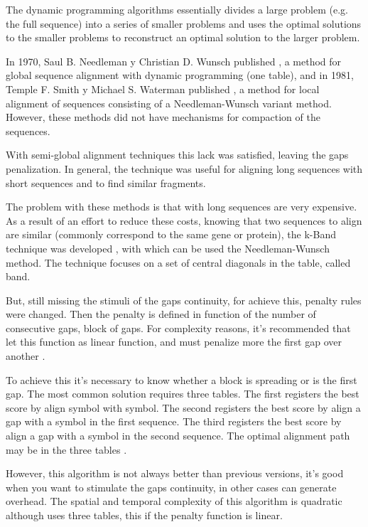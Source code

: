 \documentclass[journal]{IEEEtran}
\begin{document}
The dynamic programming algorithms essentially divides a large problem (e.g. the full sequence) into a series of smaller problems and uses the optimal solutions to the smaller problems to reconstruct an optimal solution to the larger problem.

In 1970, Saul B. Needleman y Christian D. Wunsch published \cite{needleman1970align}, a method for global sequence alignment with dynamic programming (one table), and in 1981, Temple F. Smith y Michael S. Waterman published \cite{smith1981align}, a method for local alignment of sequences consisting of a Needleman-Wunsch variant method. However, these methods did not have mechanisms for compaction of the sequences.

With semi-global alignment techniques this lack was satisfied, leaving the gaps penalization. In general, the technique was useful for aligning long sequences with short sequences and to find similar fragments.

The problem with these methods is that with long sequences are very expensive. As a result of an effort to reduce these costs, knowing that two sequences to align are similar (commonly correspond to the same gene or protein), the k-Band technique was developed \cite{chao1992align}, with which can be used the Needleman-Wunsch method. The technique focuses on a set of central diagonals in the table, called band.

But, still missing the stimuli of the gaps continuity, for achieve this, penalty rules were changed. Then the penalty is defined in function of the number of consecutive gaps, block of gaps. For complexity reasons, it's recommended that let this function as linear function, and must penalize more the first gap over another \cite{gotoh1993align}.

To achieve this it's necessary to know whether a block is spreading or is the first gap. The most common solution requires three tables. The first registers the best score by align symbol with symbol. The second registers the best score by align a gap with a symbol in the first sequence. The third registers the best score by align a gap with a symbol in the second sequence. The optimal alignment path may be in the three tables \cite{gotoh1993align}.

However, this algorithm is not always better than previous versions, it's good when you want to stimulate the gaps continuity, in other cases can generate overhead. The spatial and temporal complexity of this algorithm is quadratic although uses three tables, this if the penalty function is linear.
\end{document}
